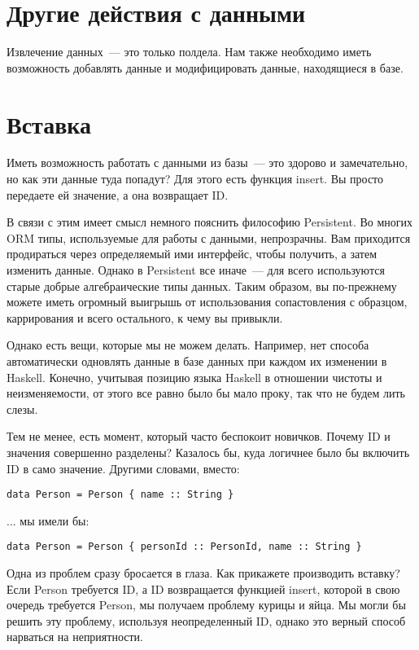 \section{Другие действия с данными} %

Извлечение данных~--- это только полдела. Нам также необходимо иметь возможность добавлять данные и модифицировать данные, находящиеся в базе.

\section{Вставка} %

Иметь возможность работать с данными из базы~--- это здорово и замечательно, но как эти данные туда попадут? Для этого есть функция insert. Вы просто передаете ей значение, а она возвращает ID.

В связи с этим имеет смысл немного пояснить философию Persistent. Во многих ORM типы, используемые для работы с данными, непрозрачны. Вам приходится продираться через определяемый ими интерфейс, чтобы получить, а затем изменить данные. Однако в Persistent все иначе~--- для всего используются старые добрые алгебраические типы данных. Таким образом, вы по-прежнему можете иметь огромный выигрышь от использования сопастовления с образцом, каррирования и всего остального, к чему вы привыкли.

Однако есть вещи, которые мы не можем делать. Например, нет способа автоматически одновлять данные в базе данных при каждом их изменении в Haskell. Конечно, учитывая позицию языка Haskell в отношении чистоты и неизменяемости, от этого все равно было бы мало проку, так что не будем лить слезы.

Тем не менее, есть момент, который часто беспокоит новичков. Почему ID и значения совершенно разделены? Казалось бы, куда логичнее было бы включить ID в само значение. Другими словами, вместо:

\begin{lstlisting}
data Person = Person { name :: String }
\end{lstlisting}

... мы имели бы:

\begin{lstlisting}
data Person = Person { personId :: PersonId, name :: String }
\end{lstlisting}

Одна из проблем сразу бросается в глаза. Как прикажете производить вставку? Если Person требуется ID, а ID возвращается функцией insert, которой в свою очередь требуется Person, мы получаем проблему курицы и яйца. Мы могли бы решить эту проблему, используя неопределенный ID, однако это верный способ нарваться на неприятности.

